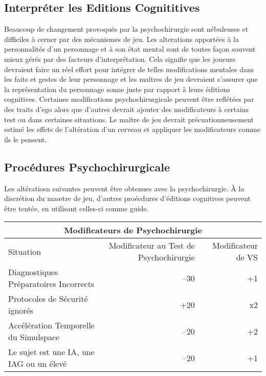 \subsection{Interpréter les Editions Cognititives} Beaucoup de changement provoqués par la psychochirurgie sont nébuleuses et difficiles à cerner par des mécanismes de jeu. Les alterations apportées à la personnalités d'un personnage et à son état mental sont de toutes façon souvent mieux gérés par des facteurs d'interprétation. Cela signifie que les joueurs devraient faire un réel effort pour intégrer de telles modifications mentales dans les faits et gestes de leur personnage et les maîtres de jeu devraient s'assurer que la représentation du personnage sonne juste par rapport à leurs éditions cognitives. Certaines modifications psychochirurgicale peuvent être reflétées par des traits d'ego alors que d'autres devrait ajouter des modificateurs à certains test ou dans certaines situations. Le maître de jeu devrait précuationneusement estimé les effets de l'altération d'un cerveau et appliquer les modificateurs comme ils le pensent. 



\subsection{Procédures Psychochirurgicale} Les altératiosn suivantes peuvent être obtenues avec la psychochirurgie. À la discrétion du maœtre de jeu, d'autres proécdures d'éditions cognitives peuvent être tentée, en utilisant celles-ci comme guide. 



\begin{table} \begin{tabular}{|l|r|r|} \hline

\multicolumn{3}{|c|}{\textbf{Modificateurs de Psychochirurgie}} \\ \hline

Situation &Modificateur au Test de Psychochirurgie &Modificateur de VS\\ \hline

Diagnostiques Préparatoires Incorrects &–30 &+1 \\ \hline

Protocoles de Sécurité ignorés &+20 &x2 \\ \hline

Accélération Temporelle du Simulspace &–20 &+2 \\ \hline

Le sujet est une IA, une IAG ou un élevé &–20 &+1 \\ \hline

\end{tabular} \label{tab:psychosurgery-modifiers} \end{table} 



